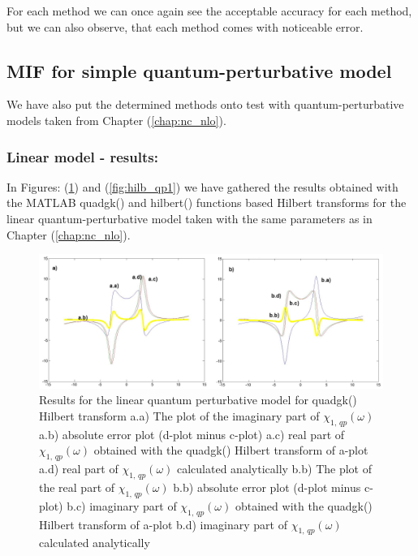 \documentclass[12pt,twoside,a4paper]{article}
\numberwithin{equation}{subsection}
\numberwithin{figure}{subsection}
\begin{document}
For each method we can once again see the acceptable accuracy for each method, but we can also observe, that each method comes with noticeable error.

\subsection{MIF for simple quantum-perturbative model} \label{chap:matlab_quantum}

We have also put the determined methods onto test with quantum-perturbative models taken from Chapter (\ref{chap:nc_nlo}).

\subsubsection*{Linear model - results:}

In Figures: (\ref{fig:quadgk_qp1}) and (\ref{fig:hilb_qp1}) we have gathered the results ob\-tained with the MATLAB quadgk() and hilbert() functions based Hil\-bert tran\-sforms for the linear qua\-ntum\--per\-tur\-ba\-tive model taken with the same para\-meters as in Chapter (\ref{chap:nc_nlo}).

\begin{figure}
  \includegraphics[width=150mm]{img/quadgk_qp1.png}
  \caption{Results for the linear quantum perturbative model for quadgk() Hilbert transform
    a.a) The plot of the imaginary part of ${\chi_{1, \, qp}}(\omega )$
    a.b) absolute error plot (d-plot minus c-plot) 
    a.c) real part of ${\chi_{1, \, qp}}(\omega )$ obtained with the quadgk() Hilbert transform of a-plot 
    a.d) real part of ${\chi_{1, \, qp}}(\omega )$ calculated analytically 
    b.b) The plot of the real part of ${\chi_{1, \, qp}}(\omega )$ 
    b.b) absolute error plot (d-plot minus c-plot) 
    b.c) imaginary part of ${\chi_{1, \, qp}}(\omega )$ obtained with the quadgk()  Hilbert transform of a-plot 
    b.d) imaginary part of ${\chi_{1, \, qp}}(\omega )$ calculated analytically  
    \label{fig:quadgk_qp1}
  }
\end{figure}
\end{document}
